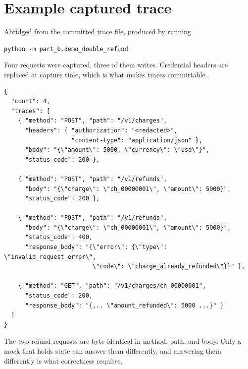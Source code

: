\documentclass[11pt]{article}
\begin{document}
\section{Example captured trace}
\label{app:trace}

Abridged from the committed trace file, produced by running

\begin{center}
\texttt{python -m part\_b.demo\_double\_refund}
\end{center}

\noindent Four requests were captured, three of them writes. Credential headers are
replaced at capture time, which is what makes traces committable.

\begin{lstlisting}
{
  "count": 4,
  "traces": [
    { "method": "POST", "path": "/v1/charges",
      "headers": { "authorization": "<redacted>",
                   "content-type": "application/json" },
      "body": "{\"amount\": 5000, \"currency\": \"usd\"}",
      "status_code": 200 },

    { "method": "POST", "path": "/v1/refunds",
      "body": "{\"charge\": \"ch_00000001\", \"amount\": 5000}",
      "status_code": 200 },

    { "method": "POST", "path": "/v1/refunds",
      "body": "{\"charge\": \"ch_00000001\", \"amount\": 5000}",
      "status_code": 400,
      "response_body": "{\"error\": {\"type\": \"invalid_request_error\",
                         \"code\": \"charge_already_refunded\"}}" },

    { "method": "GET", "path": "/v1/charges/ch_00000001",
      "status_code": 200,
      "response_body": "{... \"amount_refunded\": 5000 ...}" }
  ]
}
\end{lstlisting}

The two refund requests are byte-identical in method, path, and body. Only a mock that
holds state can answer them differently, and answering them differently is what
correctness requires.
\end{document}
